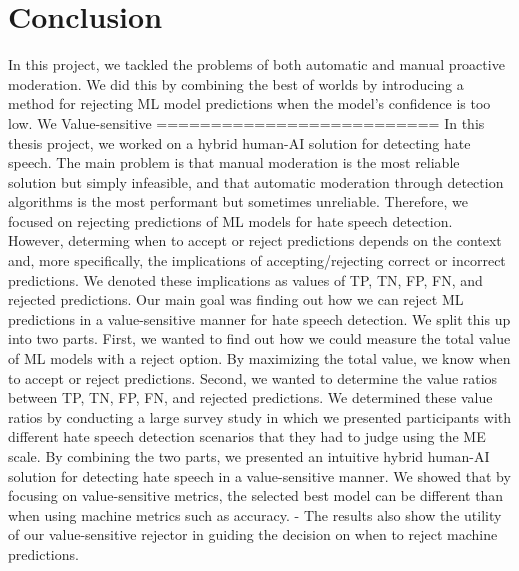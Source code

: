 \chapter{Conclusion}
In this project, we tackled the problems of both automatic and manual proactive moderation.
%
We did this by combining the best of worlds by introducing a method for rejecting ML model predictions when the model's confidence is too low.
%
We 
%
Value-sensitive 
==========================
In this thesis project, we worked on a hybrid human-AI solution for detecting hate speech.
%
The main problem is that manual moderation is the most reliable solution but simply infeasible, and that automatic moderation through detection algorithms is the most performant but sometimes unreliable.
%
Therefore, we focused on rejecting predictions of ML models for hate speech detection.
%
However, determing when to accept or reject predictions depends on the context and, more specifically, the implications of accepting/rejecting correct or incorrect predictions.
%
We denoted these implications as values of TP, TN, FP, FN, and rejected predictions.
%
Our main goal was finding out how we can reject ML predictions in a value-sensitive manner for hate speech detection.
%
We split this up into two parts.
%
First, we wanted to find out how we could measure the total value of ML models with a reject option.
%
By maximizing the total value, we know when to accept or reject predictions.
%
%
Second, we wanted to determine the value ratios between TP, TN, FP, FN, and rejected predictions.
%
We determined these value ratios by conducting a large survey study in which we presented participants with different hate speech detection scenarios that they had to judge using the ME scale.
%
By combining the two parts, we presented an intuitive hybrid human-AI solution for detecting hate speech in a value-sensitive manner.
%
We showed that by focusing on value-sensitive metrics, the selected best model can be different than when using machine metrics such as accuracy.
- The results also show the utility of our value-sensitive rejector in guiding the decision on when to reject machine predictions.